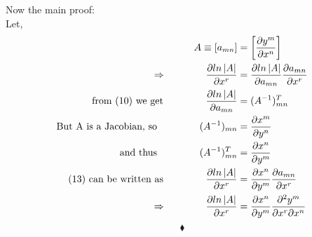Now the main proof:\\
Let, 
\begin{align}
\ A \equiv \left[ a_{mn}\right] &= \left[ \pdv{y^m}{x^n}\right]\\
\Rightarrow \quad\quad\quad\quad \pdv{ln\left|A\right|}{x^r} &= \pdv{ln\left|A\right|}{a_{mn}}\pdv{a_{mn}}{x^r}\\
\text{from (10) we get }\quad\quad\quad\quad \pdv{ln\left|A\right|}{a_{mn}} &= (A^{-1})^T_{mn}\\
\text{But A is a Jacobian, so }\quad\quad\quad\quad (A^{-1})_{mn} &= \pdv{x^m}{y^n}\\
\text{ and thus  }\quad\quad\quad\quad(A^{-1})^T_{mn} &=  \pdv{x^n}{y^m}\\
\text{(13) can be written as }  \quad\quad\quad\quad \pdv{ln\left|A\right|}{x^r} &=  \pdv{x^n}{y^m}\pdv{a_{mn}}{x^r}\\
\Rightarrow \quad\quad\quad\quad\pdv{ln\left|A\right|}{x^r} &=  \pdv{x^n}{y^m}\pdv{y^m}{x^r}{x^n}
\end{align}
$$\blacklozenge$$
\pagebreak[4]

